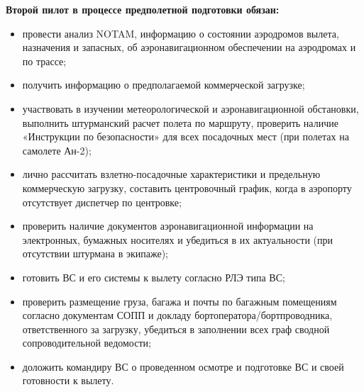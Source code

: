 \textbf{Второй пилот в процессе предполетной подготовки обязан:} 
\begin{itemize}
    \item провести анализ NOTAM, информацию о состоянии аэродромов вылета, назначения и запасных, об аэронавигационном обеспечении на аэродромах и по трассе; 
    \item получить информацию о предполагаемой коммерческой загрузке; 
    \item участвовать в изучении метеорологической и аэронавигационной обстановки, выполнить штурманский расчет полета по маршруту, проверить наличие «Инструкции по безопасности» для всех посадочных мест (при полетах на самолете Ан-2); 
    \item лично рассчитать взлетно-посадочные характеристики и предельную коммерческую загрузку, составить центровочный график, когда в аэропорту отсутствует диспетчер по центровке; 
    \item проверить наличие документов аэронавигационной информации на электронных, бумажных носителях и убедиться в их актуальности (при отсутствии штурмана в экипаже);
    \item готовить ВС и его системы к вылету согласно РЛЭ типа ВС; 
    \item проверить размещение груза, багажа и почты по багажным помещениям согласно документам СОПП и докладу бортоператора/бортпроводника, ответственного за загрузку, убедиться в заполнении всех граф сводной сопроводительной ведомости; 
    \item доложить командиру ВС о проведенном осмотре и подготовке ВС и своей готовности к вылету.
\end{itemize}

